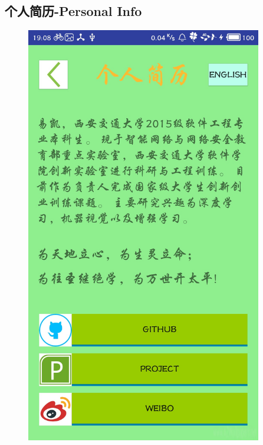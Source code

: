 \documentclass[UTF8, Microsoft YaHei]{book}
\begin{document}
    \subsection{个人简历-Personal Info}
    \begin{figure}[!htb]
    \centering
    \begin{minipage}[c]{0.5\textwidth}
    \centering
    \includegraphics[width=0.92\textwidth]{img/个人简历界面.png}
    \end{minipage}%
    \begin{minipage}[c]{0.5\textwidth}
    \centering

\end{minipage}
\end{figure}
\end{document}
